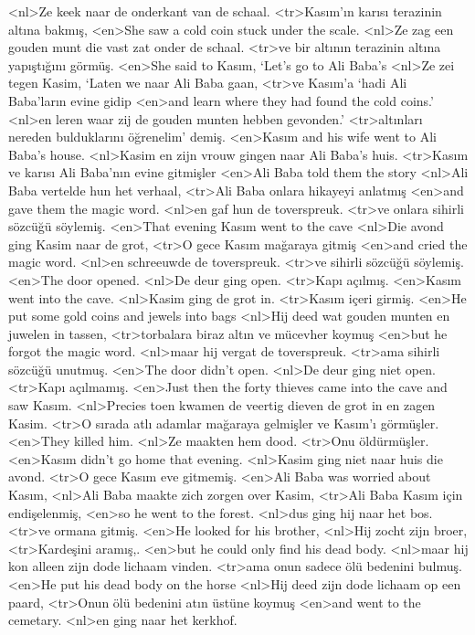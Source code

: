 <nl>Ze keek naar de onderkant van de schaal. 
<tr>Kasım’ın karısı terazinin altına bakmış,
<en>She saw a cold coin stuck under the scale.
<nl>Ze zag een gouden munt die vast zat onder de schaal. 
<tr>ve bir altının terazinin altına yapıştığını görmüş.
<en>She said to Kasım, `Let’s go to Ali Baba’s
<nl>Ze zei tegen Kasim, `Laten we naar Ali Baba gaan,
<tr>ve Kasım’a `hadi Ali Baba’ların evine gidip
<en>and learn where they had found the cold coins.'
<nl>en leren waar zij de gouden munten hebben gevonden.' 
<tr>altınları nereden bulduklarını öğrenelim' demiş.
<en>Kasım and his wife went to Ali Baba’s house.
<nl>Kasim en zijn vrouw gingen naar Ali Baba's huis. 
<tr>Kasım ve karısı Ali Baba’nın evine gitmişler
<en>Ali Baba  told them the story
<nl>Ali Baba vertelde hun het verhaal, 
<tr>Ali Baba onlara hikayeyi anlatmış
<en>and gave them the magic word.
<nl>en gaf hun de toverspreuk. 
<tr>ve onlara sihirli sözcüğü söylemiş.
<en>That evening Kasım went to the cave
<nl>Die avond ging Kasim naar de grot, 
<tr>O gece Kasım mağaraya gitmiş
<en>and cried the magic word.
<nl>en schreeuwde de toverspreuk. 
<tr>ve sihirli sözcüğü söylemiş.
<en>The door opened.
<nl>De deur ging open. 
<tr>Kapı açılmış.
<en>Kasım went into the cave.
<nl>Kasim ging de grot in.
<tr>Kasım içeri girmiş.
<en>He put some gold coins and jewels into bags
<nl>Hij deed wat gouden munten en juwelen in tassen, 
<tr>torbalara biraz altın ve mücevher koymuş
<en>but he forgot the magic word.
<nl>maar hij vergat de toverspreuk. 
<tr>ama sihirli sözcüğü unutmuş.
<en>The door didn’t open.
<nl>De deur ging niet open. 
<tr>Kapı açılmamış.
<en>Just then the forty thieves came into the cave and saw Kasım.
<nl>Precies toen kwamen de veertig dieven de grot in en zagen Kasim. 
<tr>O sırada atlı adamlar mağaraya gelmişler ve Kasım’ı görmüşler.
<en>They killed him.
<nl>Ze maakten hem dood. 
<tr>Onu öldürmüşler.
<en>Kasım didn’t go home that evening.
<nl>Kasim ging niet naar huis die avond. 
<tr>O gece Kasım eve gitmemiş.
<en>Ali Baba was worried about Kasım,
<nl>Ali Baba maakte zich zorgen over Kasim, 
<tr>Ali Baba Kasım için endişelenmiş,
<en>so he went to the forest.
<nl>dus ging hij naar het bos. 
<tr>ve ormana gitmiş.
<en>He looked for his brother,
<nl>Hij zocht zijn broer, 
<tr>Kardeşini aramış,.
<en>but he could only find his dead body.
<nl>maar hij kon alleen zijn dode lichaam vinden. 
<tr>ama onun sadece ölü bedenini bulmuş.
<en>He put his dead body on the horse
<nl>Hij deed zijn dode lichaam op een paard, 
<tr>Onun ölü bedenini atın üstüne koymuş 
<en>and went to the cemetary.
<nl>en ging naar het kerkhof. 
